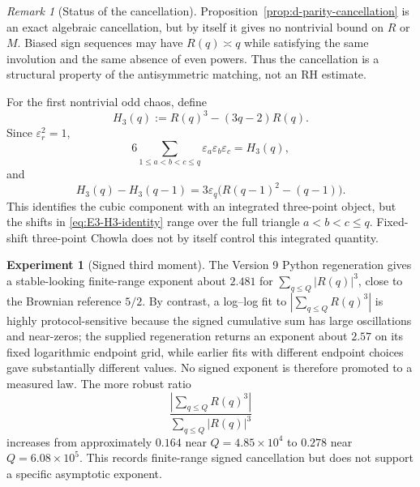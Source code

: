 \documentclass[11pt]{amsart}
\numberwithin{equation}{section}
\theoremstyle{plain}
\theoremstyle{definition}
\newtheorem{experiment}[theorem]{Experiment}
\theoremstyle{remark}
\newtheorem{remark}[theorem]{Remark}
\begin{document}
\begin{remark}[Status of the cancellation]
\label{rem:parity-not-bound}
Proposition~\ref{prop:d-parity-cancellation} is an exact algebraic
cancellation, but by itself it gives no nontrivial bound on $R$ or $M$.
Biased sign sequences may have $R(q)\asymp q$ while satisfying the same
involution and the same absence of even powers.  Thus the cancellation is a
structural property of the antisymmetric matching, not an RH estimate.
\end{remark}

For the first nontrivial odd chaos, define
\begin{equation}
\label{eq:H3-definition}
H_3(q):=R(q)^3-(3q-2)R(q).
\end{equation}
Since $\varepsilon_r^2=1$,
\begin{equation}
\label{eq:E3-H3-identity}
6\sum_{1\le a<b<c\le q}\varepsilon_a\varepsilon_b\varepsilon_c
=H_3(q),
\end{equation}
and
\begin{equation}
\label{eq:H3-increment}
H_3(q)-H_3(q-1)
=3\varepsilon_q\bigl(R(q-1)^2-(q-1)\bigr).
\end{equation}
This identifies the cubic component with an integrated three-point object, but
the shifts in \eqref{eq:E3-H3-identity} range over the full triangle
$a<b<c\le q$.  Fixed-shift three-point Chowla does not by itself control this
integrated quantity.

\begin{experiment}[Signed third moment]
\label{exp:v7-third-moment}
The Version 9 Python regeneration gives a stable-looking finite-range exponent
about $2.481$ for $\sum_{q\le Q}|R(q)|^3$, close to the Brownian reference
$5/2$.  By contrast, a log--log fit to
$|\sum_{q\le Q}R(q)^3|$ is highly protocol-sensitive because the signed
cumulative sum has large oscillations and near-zeros; the supplied regeneration
returns an exponent about $2.57$ on its fixed logarithmic endpoint grid, while
earlier fits with different endpoint choices gave substantially different
values.  No signed exponent is therefore promoted to a measured law.  The more
robust ratio
\begin{equation}
\label{eq:reported-third-moment-ratio}
\frac{|\sum_{q\le Q}R(q)^3|}{\sum_{q\le Q}|R(q)|^3}
\end{equation}
increases from approximately $0.164$ near $Q=4.85\times10^4$ to $0.278$ near
$Q=6.08\times10^5$.  This records finite-range signed cancellation but does not
support a specific asymptotic exponent.
\end{experiment}
\end{document}
